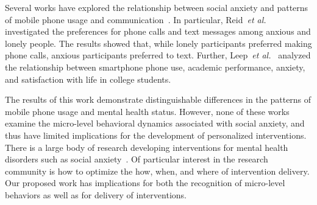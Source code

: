 Several works have explored the relationship between social anxiety and patterns of mobile phone usage and communication~\cite{reid2007text, lepp2014relationship, huang2016assessing, park2016uses, gao2016smartphone, enez2016smartphone, Shalom2015social, reid2004insights, skierkowski2012text, jin2010person, takao2009addictive}. In particular, Reid~\emph{et al.}~\cite{reid2004insights,reid2007text} investigated the preferences for phone calls and text messages among anxious and lonely people.  The results showed that, while lonely participants preferred making phone calls, anxious participants preferred to text. Further, Leep~\emph{et al.}~\cite{lepp2014relationship} analyzed the relationship between smartphone phone use, academic performance, anxiety, and satisfaction with life in college students.  %

The results of this work demonstrate distinguishable differences in the patterns of mobile phone usage and mental health status. However, none of these works examine the micro-level behavioral dynamics associated with social anxiety, and thus have limited implications for the development of personalized interventions. There is a large body of research developing interventions for mental health disorders such as social anxiety~\cite{owens2016implementation, Anstiss2015reach, lundy2016social, schroeder2016individual, Shalom2015social}.  Of particular interest in the research community is how to optimize the how, when, and where of intervention delivery.  Our proposed work has implications for both the recognition of micro-level behaviors as well as for delivery of interventions.  %



